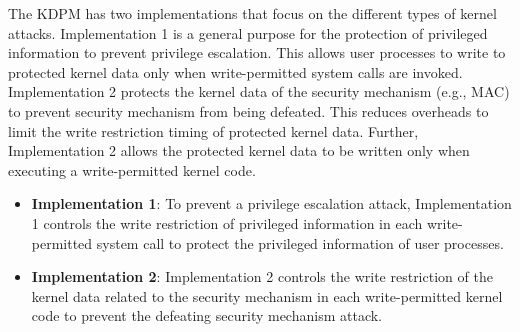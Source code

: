 

The KDPM has two implementations that focus on the different types of kernel
attacks.
%
Implementation 1 is a general purpose for the protection of privileged
information to prevent privilege escalation. This allows user processes to write
to protected kernel data only when write-permitted system calls are invoked.
%
Implementation 2 protects the kernel data of the security mechanism (e.g., MAC)
to prevent security mechanism from being defeated. This reduces overheads to
limit the write restriction timing of protected kernel data.
Further, Implementation 2 allows the protected kernel data to be written only
when executing a write-permitted kernel code.

\begin{itemize}%


\item {\bf Implementation 1}: To prevent a privilege escalation attack,
Implementation 1 controls the write restriction of privileged information in each
write-permitted system call to protect the privileged information of user processes.

\item {\bf Implementation 2}: 
Implementation 2 controls the write restriction of the kernel data related to
the security mechanism in each write-permitted kernel code to prevent the
defeating security mechanism attack.


\end{itemize}

